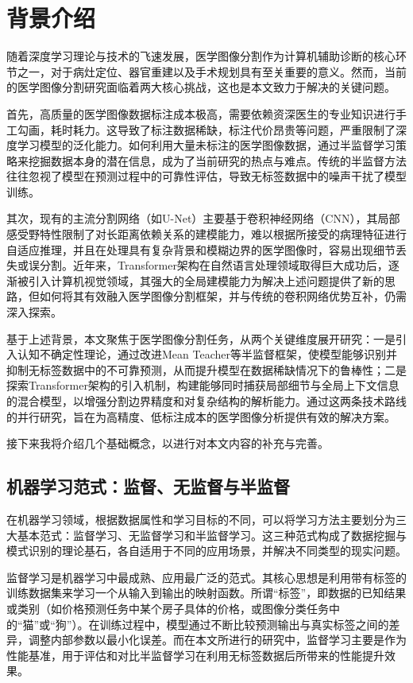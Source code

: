 \documentclass[twoside,openright]{xduugthesis}
\begin{document}
\section{背景介绍}
随着深度学习理论与技术的飞速发展，医学图像分割作为计算机辅助诊断的核心环节之一，对于病灶定位、器官重建以及手术规划具有至关重要的意义。然而，当前的医学图像分割研究面临着两大核心挑战，这也是本文致力于解决的关键问题。

首先，高质量的医学图像数据标注成本极高，需要依赖资深医生的专业知识进行手工勾画，耗时耗力。这导致了标注数据稀缺，标注代价昂贵等问题，严重限制了深度学习模型的泛化能力。如何利用大量未标注的医学图像数据，通过半监督学习策略来挖掘数据本身的潜在信息，成为了当前研究的热点与难点。传统的半监督方法往往忽视了模型在预测过程中的可靠性评估，导致无标签数据中的噪声干扰了模型训练。

其次，现有的主流分割网络（如U-Net）主要基于卷积神经网络（CNN），其局部感受野特性限制了对长距离依赖关系的建模能力，难以根据所接受的病理特征进行自适应推理，并且在处理具有复杂背景和模糊边界的医学图像时，容易出现细节丢失或误分割。近年来，Transformer架构在自然语言处理领域取得巨大成功后，逐渐被引入计算机视觉领域，其强大的全局建模能力为解决上述问题提供了新的思路，但如何将其有效融入医学图像分割框架，并与传统的卷积网络优势互补，仍需深入探索。

基于上述背景，本文聚焦于医学图像分割任务，从两个关键维度展开研究：一是引入认知不确定性理论，通过改进Mean Teacher等半监督框架，使模型能够识别并抑制无标签数据中的不可靠预测，从而提升模型在数据稀缺情况下的鲁棒性；二是探索Transformer架构的引入机制，构建能够同时捕获局部细节与全局上下文信息的混合模型，以增强分割边界精度和对复杂结构的解析能力。通过这两条技术路线的并行研究，旨在为高精度、低标注成本的医学图像分析提供有效的解决方案。

接下来我将介绍几个基础概念，以进行对本文内容的补充与完善。

\subsection{机器学习范式：监督、无监督与半监督}
在机器学习领域，根据数据属性和学习目标的不同，可以将学习方法主要划分为三大基本范式：监督学习、无监督学习和半监督学习。这三种范式构成了数据挖掘与模式识别的理论基石，各自适用于不同的应用场景，并解决不同类型的现实问题。

监督学习是机器学习中最成熟、应用最广泛的范式。其核心思想是利用带有标签的训练数据集来学习一个从输入到输出的映射函数。所谓“标签”，即数据的已知结果或类别（如价格预测任务中某个房子具体的价格，或图像分类任务中的“猫”或“狗”）。在训练过程中，模型通过不断比较预测输出与真实标签之间的差异，调整内部参数以最小化误差。而在本文所进行的研究中，监督学习主要是作为性能基准，用于评估和对比半监督学习在利用无标签数据后所带来的性能提升效果。
\end{document}
